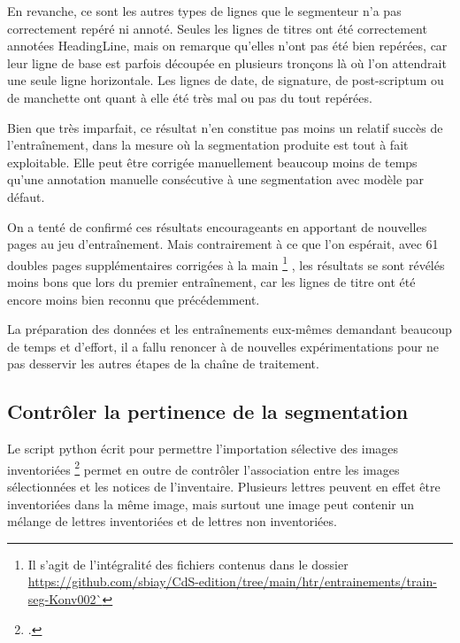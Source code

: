 \documentclass[a4paper,12pt,twoside]{book}
\begin{document}
    			En revanche, ce sont les autres types de lignes que le segmenteur n'a pas correctement repéré ni annoté. Seules les lignes de titres ont été correctement annotées \textsf{HeadingLine}, mais on remarque qu'elles n'ont pas été bien repérées, car leur ligne de base est parfois découpée en plusieurs tronçons là où l'on attendrait une seule ligne horizontale. Les lignes de date, de signature, de post-scriptum ou de manchette ont quant à elle été très mal ou pas du tout repérées.
    			
    			Bien que très imparfait, ce résultat n'en constitue pas moins un relatif succès de l'entraînement, dans la mesure où la segmentation produite est tout à fait exploitable. Elle peut être corrigée manuellement beaucoup moins de temps qu'une annotation manuelle consécutive à une segmentation avec modèle par défaut.
    			
    			On a tenté de confirmé ces résultats encourageants en apportant de nouvelles pages au jeu d'entraînement. Mais contrairement à ce que l'on espérait, avec 61 doubles pages supplémentaires corrigées à la main
    			\footnote{Il s'agit de l'intégralité des fichiers contenus dans le dossier \url{https://github.com/sbiay/CdS-edition/tree/main/htr/entrainements/train-seg-Konv002`}}
    			, les résultats se sont révélés moins bons que lors du premier entraînement, car les lignes de titre ont été encore moins bien reconnu que précédemment. 
    			
    			La préparation des données et les entraînements eux-mêmes demandant beaucoup de temps et d'effort, il a fallu renoncer à de nouvelles expérimentations pour ne pas desservir les autres étapes de la chaîne de traitement.

	    		
	    	\subsection{Contrôler la pertinence de la \gls{segmentation}}
		    	\label{controle-segmentation-lettres-inventoriees}
	    		
	    		Le script python écrit pour permettre l'importation sélective des images inventoriées \footcite{biayDonneesImagesPy2022} permet en outre de contrôler l'association entre les images sélectionnées et les notices de l'inventaire. Plusieurs lettres peuvent en effet être inventoriées dans la même image, mais surtout une image peut contenir un mélange de lettres inventoriées et de lettres non inventoriées.
	    		
\end{document}
